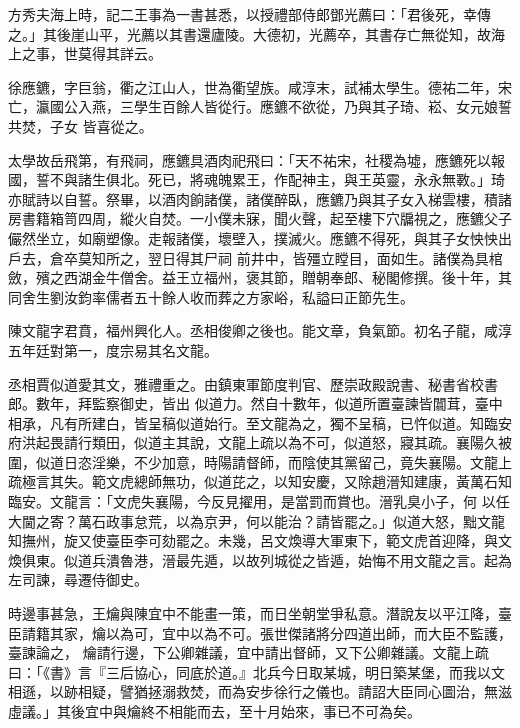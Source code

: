 \begin{pinyinscope}
 方秀夫海上時，記二王事為一書甚悉，以授禮部侍郎鄧光薦曰：「君後死，幸傳之。」其後崖山平，光薦以其書還廬陵。大德初，光薦卒，其書存亡無從知，故海上之事，世莫得其詳云。



 徐應鑣，字巨翁，衢之江山人，世為衢望族。咸淳末，試補太學生。德祐二年，宋亡，瀛國公入燕，三學生百餘人皆從行。應鑣不欲從，乃與其子琦、崧、女元娘誓共焚，子女
 皆喜從之。



 太學故岳飛第，有飛祠，應鑣具酒肉祀飛曰：「天不祐宋，社稷為墟，應鑣死以報國，誓不與諸生俱北。死已，將魂魄累王，作配神主，與王英靈，永永無斁。」琦亦賦詩以自誓。祭畢，以酒肉餉諸僕，諸僕醉臥，應鑣乃與其子女入梯雲樓，積諸房書籍箱笥四周，縱火自焚。一小僕未寐，聞火聲，起至樓下穴牖視之，應鑣父子儼然坐立，如廟塑像。走報諸僕，壞壁入，撲滅火。應鑣不得死，與其子女怏怏出戶去，倉卒莫知所之，翌日得其尸祠
 前井中，皆殭立瞠目，面如生。諸僕為具棺斂，殯之西湖金牛僧舍。益王立福州，褒其節，贈朝奉郎、秘閣修撰。後十年，其同舍生劉汝鈞率儒者五十餘人收而葬之方家峪，私謚曰正節先生。



 陳文龍字君賁，福州興化人。丞相俊卿之後也。能文章，負氣節。初名子龍，咸淳五年廷對第一，度宗易其名文龍。



 丞相賈似道愛其文，雅禮重之。由鎮東軍節度判官、歷崇政殿說書、秘書省校書郎。數年，拜監察御史，皆出
 似道力。然自十數年，似道所置臺諫皆闒茸，臺中相承，凡有所建白，皆呈稿似道始行。至文龍為之，獨不呈稿，已忤似道。知臨安府洪起畏請行類田，似道主其說，文龍上疏以為不可，似道怒，寢其疏。襄陽久被圍，似道日恣淫樂，不少加意，時陽請督師，而陰使其黨留己，竟失襄陽。文龍上疏極言其失。範文虎總師無功，似道芘之，以知安慶，又除趙溍知建康，黃萬石知臨安。文龍言：「文虎失襄陽，今反見擢用，是當罰而賞也。溍乳臭小子，何
 以任大閫之寄？萬石政事怠荒，以為京尹，何以能治？請皆罷之。」似道大怒，黜文龍知撫州，旋又使臺臣李可劾罷之。未幾，呂文煥導大軍東下，範文虎首迎降，與文煥俱東。似道兵潰魯港，溍最先遁，以故列城從之皆遁，始悔不用文龍之言。起為左司諫，尋遷侍御史。



 時邊事甚急，王爚與陳宜中不能畫一策，而日坐朝堂爭私意。潛說友以平江降，臺臣請籍其家，爚以為可，宜中以為不可。張世傑諸將分四道出師，而大臣不監護，臺諫論之，
 爚請行邊，下公卿雜議，宜中請出督師，又下公卿雜議。文龍上疏曰：「《書》言『三后協心，同底於道。』北兵今日取某城，明日築某堡，而我以文相遜，以跡相疑，譬猶拯溺救焚，而為安步徐行之儀也。請詔大臣同心圖治，無滋虛議。」其後宜中與爚終不相能而去，至十月始來，事已不可為矣。




\end{pinyinscope}
